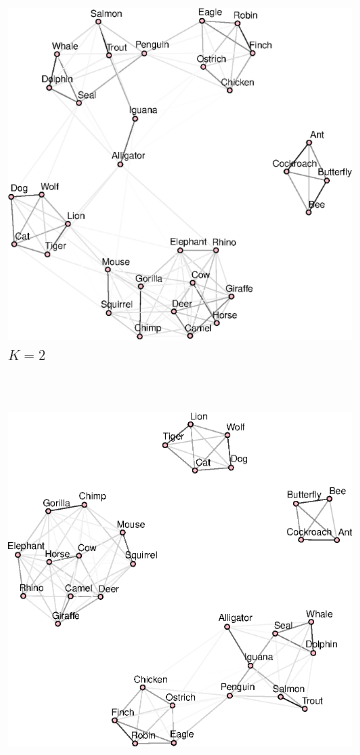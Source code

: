 \documentclass{article}
\begin{document}
\begin{figure}[!htb]
\begin{subfigure}[b]{0.35\textwidth}
        \includegraphics[width=\textwidth]{animals_graph_k2.eps}
        \caption{$K = 2$}
    \end{subfigure}
    ~
    \begin{subfigure}[b]{0.35\textwidth}
        \includegraphics[width=\textwidth]{animals_graph_k4.eps}

\end{subfigure}
\end{figure}
\end{document}
